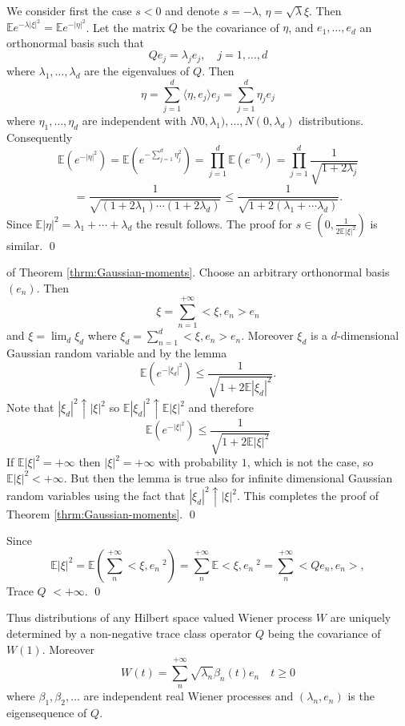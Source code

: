 \documentclass[preprint]{imsart}
\def\E{\mathbb E}
\begin{document}
{
We consider first the case $s < 0$ and denote $s = -\lambda$, $\eta =
\sqrt{\lambda} \xi$.  Then $\E e^{-\lambda|\xi|^2} = \E e^{-|\eta|^2}$.  Let
the matrix $Q$ be the covariance of $\eta$, and $e_1, \ldots , e_d$ an
orthonormal basis such that
$$
Qe_j = \lambda_j e_j, \quad j = 1, \ldots, d
$$
where $\lambda_1, \ldots, \lambda_d$ are the eigenvalues of $Q$.  Then
$$
\eta = \sum_{j=1}^d \langle \eta,e_j \rangle e_j = \sum_{j=1}^d \eta_j e_j
$$
where $\eta_1,\ldots,\eta_d$ are independent with
$N0,\lambda_1),\ldots,N(0,\lambda_d)$ distributions.  Consequently
\begin{equation}
    \E \left( e^{-|\eta|^2} \right) =
    \E \left( e^{-\sum_{j=1}^d \eta_j^2 }\right) =
    \prod_{j=1}^d \E \left( e^{-\eta_j} \right)=
    \prod_{j=1}^d \frac{1}{\sqrt{1 + 2\lambda_j}}
\end{equation}
$$=
    \frac{1}{\sqrt{(1 + 2\lambda_1) \cdots (1 + 2\lambda_d) }} \leq
    \frac{1}{\sqrt{1 + 2(\lambda_1 + \cdots \lambda_d)}}.
$$
Since $\E |\eta|^2 = \lambda_1 + \cdots + \lambda_d$ the result follows. The
proof for $s \in (0,\frac{1}{2\E|\xi|^2})$ is similar.
\qed

of Theorem \ref{thrm:Gaussian-moments}.
\newcommand{\xidsq}{|\xi_d|^2}
Choose an arbitrary
orthonormal basis $(e_n)$.  Then
$$
\xi = \sum_{n=1}^{+\infty} < \xi , e_n > e_n
$$
and $\xi = \lim_d \xi_d$ where $\xi_d = \sum_{n=1}^d < \xi,e_n > e_n$.
Moreover $\xi_d$ is a $d$-dimensional Gaussian random variable and by the lemma
$$
\E \left( e^{-|\xi_d|^2} \right) \leq \frac{1}{\sqrt{1 + 2 \E|\xi_d|^2}}.
$$
Note that $|\xi_d|^2 \uparrow |\xi|^2$ so $\E |\xi_d|^2 \uparrow \E|\xi|^2$
and therefore
$$
\E\left(e^{-|\xi|^2} \right) \leq \frac{1}{\sqrt{1 + 2\E |\xi|^2 }}
$$
If $\E |\xi|^2 = +\infty$ then $|\xi|^2 = +\infty$ with probability $1$, which
is not the case, so $\E |\xi|^2 < +\infty$.  But then the lemma is true also for
infinite dimensional Gaussian random variables using the fact that $|\xi_d|^2
\uparrow |\xi|^2$.  This completes the proof of Theorem \ref{thrm:Gaussian-moments}.
\qed
\vspace{2mm}

\noindent Since
$$
    \E |\xi|^2 = \E \left( \sum_{n}^{+\infty} < \xi , e_n \>^2 \right)
    = \sum_{n}^{+\infty} \E < \xi, e_n \>^2 = \sum_{n}^{+\infty} < Qe_n,
    e_n >,
$$
Trace $Q$ $ < +\infty.$ \qed
\vspace{3mm}

Thus distributions of any Hilbert space valued Wiener process $W$ are
uniquely determined by a non-negative trace class operator $Q$ being the
covariance of $W(1)$.  Moreover
$$
W(t) = \sum_{n}^{+\infty} \sqrt{\lambda_n}\beta_n(t) e_n \quad t \geq 0
$$
where $\beta_1, \beta_2, \ldots$ are independent real Wiener processes and
$(\lambda_n,e_n)$ is the eigensequence of $Q$.

}
\end{document}
